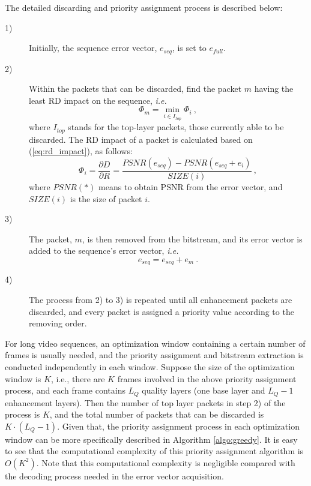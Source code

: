 \documentclass[journal]{IEEEtran}
\begin{document}
The detailed discarding and priority assignment process is described below:
\begin{description}
\item[1)] Initially, the sequence error vector, $e_{seq}$, is set to $e_{full}$.
\item[2)] Within the packets that can be discarded, find the packet $m$ having the least RD impact on the sequence, \textit{i.e. }
\begin{equation}
\label{eq:R-D_impact_m}
\Phi_m = \min_{i \in I_{top}} \Phi_i \: ,
\end{equation}
where $I_{top}$ stands for the top-layer packets, those currently able to be discarded. The RD impact of a packet is calculated based on (\ref{eq:rd_impact}), as follows: 
\begin{equation}
\label{eq:R-D_impact_i}
\Phi_i = \dfrac{\partial D}{\partial R} = \dfrac{PSNR(e_{seq}) - PSNR(e_{seq} + e_i)}{SIZE(i)} \: ,
\end{equation}
where $PSNR(*)$ means to obtain PSNR from the error vector, and $SIZE(i)$ is the size of packet $i$.
\item[3)]The packet, $m$, is then removed from the bitstream, and its error vector is added to the sequence's error vector, \textit{i.e.}
\begin{equation}
\label{eq:error_update}
e_{seq} = e_{seq} + e_m \: .
\end{equation}
\item[4)]The process from 2) to 3) is repeated until all enhancement packets are discarded, and every packet is assigned a priority value according to the removing order.
\end{description}

For long video sequences, an optimization window containing a certain number of frames is usually needed, and the priority assignment and bitstream extraction is conducted independently in each window. Suppose the size of the optimization window is $K$, i.e., there are $K$ frames involved in the above priority assignment process, and each frame contains $L_Q$ quality layers (one base layer and $L_Q-1$ enhancement layers). Then the number of top layer packets in step 2) of the process is $K$, and the total number of packets that can be discarded is $K \cdot (L_Q-1)$. Given that, the priority assignment process in each optimization window can be more specifically described in Algorithm \ref{algo:greedy}. It is easy to see that the computational complexity of this priority assignment algorithm is $O(K^2)$. Note that this computational complexity is negligible compared with the decoding process needed in the error vector acquisition.
\end{document}
